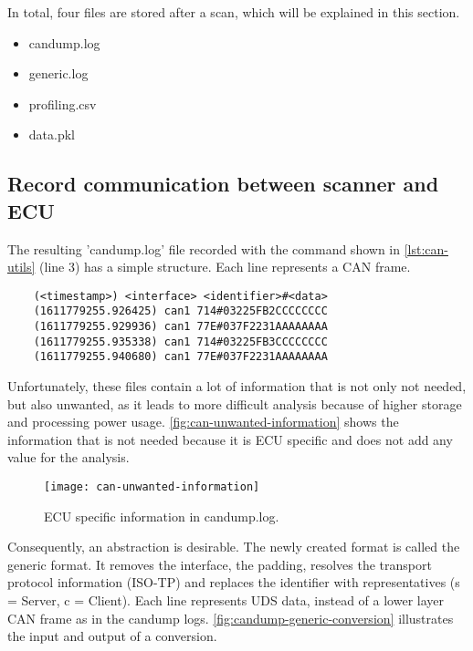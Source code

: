 In total, four files are stored after a scan, which will be explained in this section.

\begin{itemize}
    \item candump.log
    \item generic.log
    \item profiling.csv
    \item data.pkl
\end{itemize}

\subsection{Record communication between scanner and ECU}

The resulting 'candump.log' file recorded with the command shown in \autoref{lst:can-utils} (line 3) has a simple structure. Each line represents a CAN frame.

\begin{samepage}
\begin{verbatim}
    (<timestamp>) <interface> <identifier>#<data>
    (1611779255.926425) can1 714#03225FB2CCCCCCCC
    (1611779255.929936) can1 77E#037F2231AAAAAAAA
    (1611779255.935338) can1 714#03225FB3CCCCCCCC
    (1611779255.940680) can1 77E#037F2231AAAAAAAA
\end{verbatim}
\end{samepage}

Unfortunately, these files contain a lot of information that is not only not needed, but also unwanted, as it leads to more difficult analysis because of higher storage and processing power usage. \autoref{fig:can-unwanted-information} shows the information that is not needed because it is ECU specific and does not add any value for the analysis.

\begin{figure}[H]
    \centering
    \texttt{[image: can-unwanted-information]}
    \caption{ECU specific information in candump.log.}
    \label{fig:can-unwanted-information}
\end{figure}

Consequently, an abstraction is desirable. The newly created format is called the generic format. It removes the interface, the padding, resolves the transport protocol information (ISO-TP) and replaces the identifier with representatives (s = Server, c = Client). Each line represents UDS data, instead of a lower layer CAN frame as in the candump logs. \autoref{fig:candump-generic-conversion} illustrates the input and output of a conversion.

